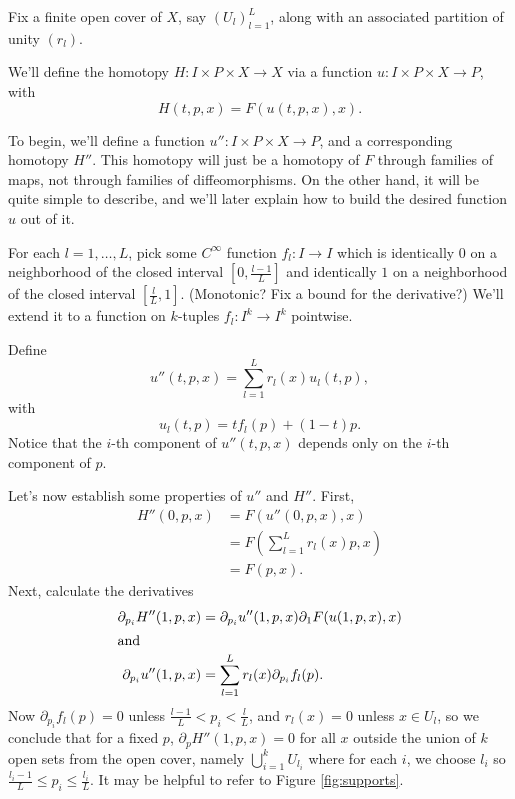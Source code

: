 
Fix a finite open cover of $X$, say $(U_l)_{l=1}^L$, along with an
associated partition of unity $(r_l)$.

We'll define the homotopy $H:I \times P \times X \to X$ via a function
$u:I \times P \times X \to P$, with
\begin{equation*}
H(t,p,x) = F(u(t,p,x),x).
\end{equation*}

To begin, we'll define a function $u'' : I \times P \times X \to P$, and
a corresponding homotopy $H''$. This homotopy will just be a homotopy of
$F$ through families of maps, not through families of diffeomorphisms. On
the other hand, it will be quite simple to describe, and we'll later
explain how to build the desired function $u$ out of it.

For each $l = 1, \ldots, L$, pick some $C^\infty$ function $f_l : I \to
I$ which is identically $0$ on a neighborhood of the closed interval $[0,\frac{l-1}{L}]$
and identically $1$ on a neighborhood of the closed interval $[\frac{l}{L},1]$. (Monotonic?
Fix a bound for the derivative?) We'll extend it to a function on
$k$-tuples $f_l : I^k \to I^k$ pointwise.

Define $$u''(t,p,x) = \sum_{l=1}^L r_l(x) u_l(t,p),$$ with
$$u_l(t,p) = t f_l(p) + (1-t)p.$$ Notice that the $i$-th component of $u''(t,p,x)$ depends only on the $i$-th component of $p$.

Let's now establish some properties of $u''$ and $H''$. First,
\begin{align*}
H''(0,p,x) & = F(u''(0,p,x),x) \\
           & = F(\sum_{l=1}^L r_l(x) p, x) \\
           & = F(p,x).
\end{align*}
Next, calculate the derivatives
\begin{align*}
\partial_{p_i} H''(1,p,x) & = \partial_{p_i}u''(1,p,x) \partial_1 F(u(1,p,x),x) \\
\intertext{and}
\partial_{p_i}u''(1,p,x) & = \sum_{l=1}^L r_l(x) \partial_{p_i} f_l(p).
\end{align*}
Now $\partial_{p_i} f_l(p) = 0$ unless $\frac{l-1}{L} < p_i < \frac{l}{L}$, and $r_l(x) = 0$ unless $x \in U_l$,
so we conclude that for a fixed $p$, $\partial_p H''(1,p,x) = 0$ for all $x$ outside the union of $k$ open sets from the open cover, namely
$\bigcup_{i=1}^k U_{l_i}$ where for each $i$, we choose $l_i$ so $\frac{l_i -1}{L} \leq p_i \leq \frac{l_i}{L}$. It may be helpful to refer to Figure \ref{fig:supports}.

